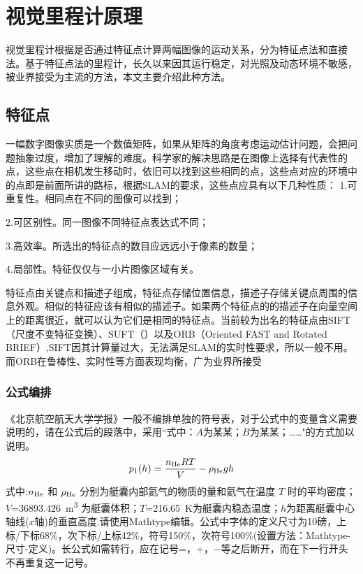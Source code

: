 \documentclass[10.5pt,twocolumn]{jbuaa}
\begin{document}
 
\section{视觉里程计原理}
视觉里程计根据是否通过特征点计算两幅图像的运动关系，分为特征点法和直接法。基于特征点法的里程计，长久以来因其运行稳定，对光照及动态环境不敏感，被业界接受为主流的方法，本文主要介绍此种方法。
\subsection{特征点}
一幅数字图像实质是一个数值矩阵，如果从矩阵的角度考虑运动估计问题，会把问题抽象过度，增加了理解的难度。科学家的解决思路是在图像上选择有代表性的点，这些点在相机发生移动时，依旧可以找到这些相同的点，这些点对应的环境中的点即是前面所讲的路标，根据SLAM的要求，这些点应具有以下几种性质：
1.可重复性。相同点在不同的图像可以找到；

2.可区别性。同一图像不同特征点表达式不同；

3.高效率。所选出的特征点的数目应远远小于像素的数量；

4.局部性。特征仅仅与一小片图像区域有关。

特征点由关键点和描述子组成，特征点存储位置信息，描述子存储关键点周围的信息外观。相似的特征应该有相似的描述子。如果两个特征点的的描述子在向量空间上的距离很近，就可以认为它们是相同的特征点。当前较为出名的特征点由SIFT（尺度不变特征变换）、SUFT（）以及ORB（Oriented FAST and Rotated BRIEF）,SIFT因其计算量过大，无法满足SLAM的实时性要求，所以一般不用。而ORB在鲁棒性、实时性等方面表现均衡，广为业界所接受
\subsubsection{公式编排}
\label{labSecForm}
《北京航空航天大学学报》一般不编排单独的符号表，对于公式中的变量含义需要说明的，请在公式后的段落中，采用``式中：$A$为某某；$B$为某某；……"的方式加以说明。
\begin{equation}
\label{eqnLabelp}
p_1 (h) = \dfrac{n_{\textnormal{He}}RT}{V}-\rho_{\textnormal{He}}gh
\end{equation}
式中:$n_{\textnormal{He}}$ 和 $\rho_{\textnormal{He}}$ 分别为艇囊内部氦气的物质的量和氦气在温度 $T$ 时的平均密度；
$V$=\SI{36893.426}{\cubic\meter}%
为艇囊体积；$T$=\SI{216.65}{\kelvin}为艇囊内稳态温度；$h$为距离艇囊中心轴线($x$轴)的垂直高度.请使用Mathtype编辑。公式中字体的定义尺寸为10磅，上标/下标68\%，次下标/上标42\%，符号150\%，次符号100\%(设置方法：Mathtype-尺寸-定义)。长公式如需转行，应在记号=，+，$-$等之后断开，而在下一行开头不再重复这一记号。
\end{document}
